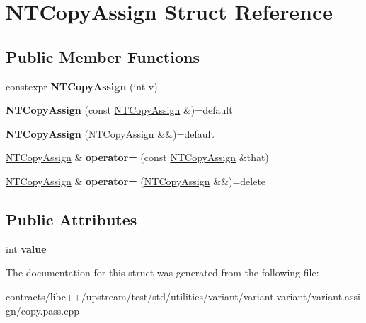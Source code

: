 \hypertarget{struct_n_t_copy_assign}{}\section{N\+T\+Copy\+Assign Struct Reference}
\label{struct_n_t_copy_assign}
\subsection*{Public Member Functions}
\begin{DoxyCompactItemize}
\item 
\mbox{\label{struct_n_t_copy_assign_a6402c8a7ceb17716e14e3e4d7c9633d1}} 
constexpr {\bfseries N\+T\+Copy\+Assign} (int v)
\item 
\mbox{\label{struct_n_t_copy_assign_abf3af54167c8bc998a601d9d13a7c961}} 
{\bfseries N\+T\+Copy\+Assign} (const \mbox{\hyperlink{struct_n_t_copy_assign}{N\+T\+Copy\+Assign}} \&)=default
\item 
\mbox{\label{struct_n_t_copy_assign_a2dba0ec54a1529eb22f5d581e0e44093}} 
{\bfseries N\+T\+Copy\+Assign} (\mbox{\hyperlink{struct_n_t_copy_assign}{N\+T\+Copy\+Assign}} \&\&)=default
\item 
\mbox{\label{struct_n_t_copy_assign_a729faac20e7b95c381c5154386afa79c}} 
\mbox{\hyperlink{struct_n_t_copy_assign}{N\+T\+Copy\+Assign}} \& {\bfseries operator=} (const \mbox{\hyperlink{struct_n_t_copy_assign}{N\+T\+Copy\+Assign}} \&that)
\item 
\mbox{\label{struct_n_t_copy_assign_a72be9927aa109604839914ae2b76df12}} 
\mbox{\hyperlink{struct_n_t_copy_assign}{N\+T\+Copy\+Assign}} \& {\bfseries operator=} (\mbox{\hyperlink{struct_n_t_copy_assign}{N\+T\+Copy\+Assign}} \&\&)=delete
\end{DoxyCompactItemize}
\subsection*{Public Attributes}
\begin{DoxyCompactItemize}
\item 
\mbox{\label{struct_n_t_copy_assign_a60a0e27d59ebea7fb958a3deeb012ab1}} 
int {\bfseries value}
\end{DoxyCompactItemize}


The documentation for this struct was generated from the following file\+:\begin{DoxyCompactItemize}
\item 
contracts/libc++/upstream/test/std/utilities/variant/variant.\+variant/variant.\+assign/copy.\+pass.\+cpp\end{DoxyCompactItemize}
